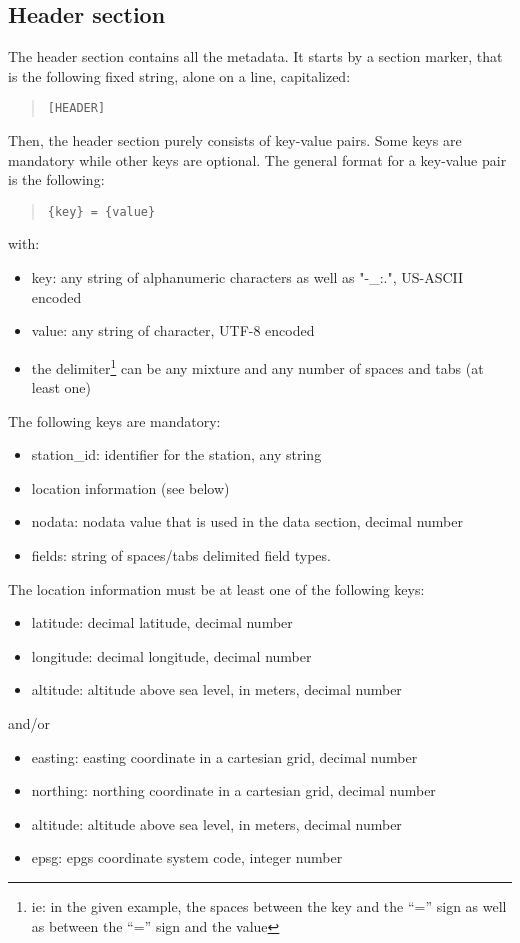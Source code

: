 \documentclass[a4paper,10pt]{article}
\begin{document}
\subsection{Header section}
The header section contains all the metadata. It starts by a section marker, that is the following fixed string, alone on a line, capitalized:
\begin{quote} \begin{verbatim}
[HEADER]
\end{verbatim}\end{quote} 
Then, the header section purely consists of key-value pairs. Some keys are mandatory while other keys are optional. The general format for a key-value pair is the following:
\begin{quote} \begin{verbatim}
{key} = {value}
\end{verbatim}\end{quote} 
with:
\begin{itemize}
	\item key: any string of alphanumeric characters as well as "-\_:.", US-ASCII encoded
	\item value: any string of character, UTF-8 encoded
	\item the delimiter\footnote{ie: in the given example, the spaces between the key and the ``='' sign as well as between the ``='' sign and the value} can be any mixture and any number of spaces and tabs (at least one)
\end{itemize}
The following keys are mandatory:
\begin{itemize}
	\item station\_id: identifier for the station, any string
	\item location information (see below)
	\item nodata: nodata value that is used in the data section, decimal number
	\item fields: string of spaces/tabs delimited field types.
\end{itemize}
The location information must be at least one of the following keys:
\begin{itemize}
	\item latitude: decimal latitude, decimal number
	\item longitude: decimal longitude, decimal number
	\item altitude: altitude above sea level, in meters, decimal number
\end{itemize}
and/or
\begin{itemize}
	\item easting: easting coordinate in a cartesian grid, decimal number
	\item northing: northing coordinate in a cartesian grid, decimal number
	\item altitude: altitude above sea level, in meters, decimal number
	\item epsg: epgs coordinate system code, integer number
\end{itemize}
\end{document}
